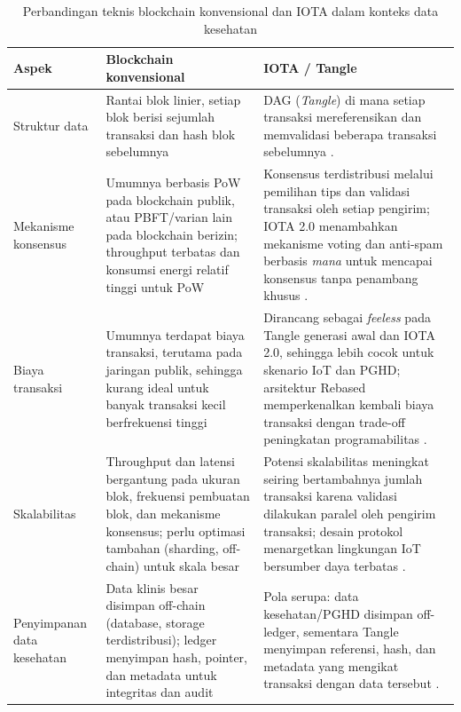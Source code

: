 \begin{table}[h]
  \centering
  \caption{Perbandingan teknis blockchain konvensional dan IOTA dalam konteks data kesehatan}
  \label{tab:blockchain-iota-comparison}
  \begin{tabular}{p{3cm}p{5.5cm}p{5.5cm}}
    \toprule
    Aspek & Blockchain konvensional & IOTA / Tangle \\
    \midrule
    Struktur data & Rantai blok linier, setiap blok berisi sejumlah transaksi dan hash blok sebelumnya \parencite{Mayer_2020_ehr_blockchain_slr, Yang_2021_blockchain_architecture_ehr} & DAG (\emph{Tangle}) di mana setiap transaksi mereferensikan dan memvalidasi beberapa transaksi sebelumnya \parencite{TheTangle_Popov_2017,FromTangleToRebased_2024}. \\
    \midrule
    Mekanisme konsensus & Umumnya berbasis PoW pada blockchain publik, atau PBFT/varian lain pada blockchain berizin; throughput terbatas dan konsumsi energi relatif tinggi untuk PoW \parencite{Mayer_2020_ehr_blockchain_slr,Ettaloui_2024_blockchain_ehr_slr} & Konsensus terdistribusi melalui pemilihan tips dan validasi transaksi oleh setiap pengirim; IOTA 2.0 menambahkan mekanisme voting dan anti-spam berbasis \emph{mana} untuk mencapai konsensus tanpa penambang khusus \parencite{IOTA_Tangle2_2022,FromTangleToRebased_2024}. \\
    \midrule
    Biaya transaksi & Umumnya terdapat biaya transaksi, terutama pada jaringan publik, sehingga kurang ideal untuk banyak transaksi kecil berfrekuensi tinggi \parencite{Ettaloui_2024_blockchain_ehr_slr, Rawat2025_Blockchain_Secure_EHR} & Dirancang sebagai \emph{feeless} pada Tangle generasi awal dan IOTA 2.0, sehingga lebih cocok untuk skenario IoT dan PGHD; arsitektur Rebased memperkenalkan kembali biaya transaksi dengan trade-off peningkatan programabilitas \parencite{Elevating_2025_iota_ehealth,FromTangleToRebased_2024}. \\
    \midrule
    Skalabilitas & Throughput dan latensi bergantung pada ukuran blok, frekuensi pembuatan blok, dan mekanisme konsensus; perlu optimasi tambahan (sharding, off-chain) untuk skala besar \parencite{Mayer_2020_ehr_blockchain_slr} & Potensi skalabilitas meningkat seiring bertambahnya jumlah transaksi karena validasi dilakukan paralel oleh pengirim transaksi; desain protokol menargetkan lingkungan IoT bersumber daya terbatas \parencite{TheTangle_Popov_2017,IOTA_Tangle2_2022}. \\
    \midrule
    Penyimpanan data kesehatan & Data klinis besar disimpan off-chain (database, storage terdistribusi); ledger menyimpan hash, pointer, dan metadata untuk integritas dan audit \parencite{Ettaloui_2024_blockchain_ehr_slr,Yang_2021_blockchain_architecture_ehr} & Pola serupa: data kesehatan/PGHD disimpan off-ledger, sementara Tangle menyimpan referensi, hash, dan metadata yang mengikat transaksi dengan data tersebut \parencite{Elevating_2025_iota_ehealth, Exploring_IOTA_HealthData_2022}. \\

\end{tabular}
\end{table}
